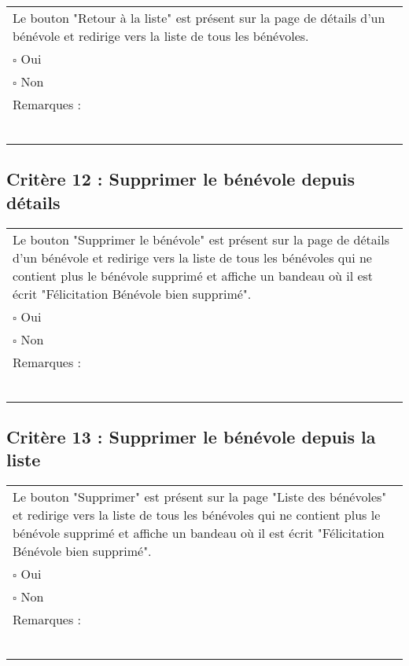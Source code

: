 	\begin{center}
    	 		\begin{tabular}[h]{|p{}|}
			\hline
				Le bouton "Retour à la liste" est présent sur la page de détails d'un bénévole et redirige vers la liste de tous les bénévoles.\\
				$\square$ Oui  \\ $\square$ Non \\\hline Remarques : \\ ~\\
			 \\\hline
     		\end{tabular}
  		\end{center}	
  		
  		
  		\subsection*{Critère 12 : Supprimer le bénévole depuis détails}
	
	\begin{center}
    	 		\begin{tabular}[h]{|p{}|}
			\hline
				Le bouton "Supprimer le bénévole" est présent sur la page de détails d'un bénévole et redirige vers la liste de tous les bénévoles qui ne contient plus le bénévole supprimé et affiche un bandeau où il est écrit "Félicitation Bénévole bien supprimé".\\
				$\square$ Oui  \\ $\square$ Non \\\hline Remarques : \\ ~\\
			 \\\hline
     		\end{tabular}
  		\end{center}
  		
  		
  		
  			\subsection*{Critère 13 : Supprimer le bénévole depuis la liste}
	
	\begin{center}
    	 		\begin{tabular}[h]{|p{}|}
			\hline
				Le bouton "Supprimer" est présent sur la page "Liste des bénévoles" et redirige vers la liste de tous les bénévoles qui ne contient plus le bénévole supprimé et affiche un bandeau où il est écrit "Félicitation Bénévole bien supprimé".\\
				$\square$ Oui  \\ $\square$ Non \\\hline Remarques : \\ ~\\
			 \\\hline
     		\end{tabular}
  		\end{center}

